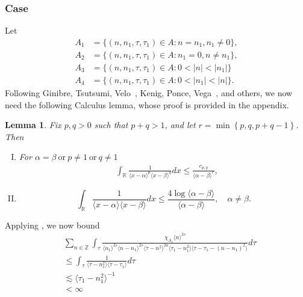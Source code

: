 \documentclass[12pt,reqno]{amsart}
\numberwithin{equation}{section}  %
\renewcommand{\cref}{\Cref}
\newcommand{\rr}{\mathbb{R}}
\newcommand{\zz}{\mathbb{Z}}
\newcommand{\zzdot}{\dot{\zz}}
\newtheorem{lemma}[theorem]{Lemma}
\begin{document}
\subsubsection{Case \cref{it-6}} 
\label{ssec:case-it-6}
Let 
\begin{align*}
A_1&=\{(n, n_1, \tau, \tau_1)\in A: n = n_{1},  n_{1} \neq 0 \},\\
A_2&=\{(n, n_1, \tau, \tau_1)\in A: n_1=0, n \neq n_{1} \},\\
A_3&=\{(n, n_1, \tau, \tau_1)\in A: 0 < | n | <  | n_{1}| \} \\
A_4&=\{(n, n_1, \tau, \tau_1)\in A: 0 < | n_{1} | <  | n| \}.
\end{align*} 
Following Ginibre, Tsutsumi, Velo~\cite{Ginibre:1997jp}, Kenig, Ponce, Vega~\cite{Kenig:1996yn}, and others,
we now need the following Calculus lemma, whose proof is provided in the
appendix.
\begin{lemma}
\label{lem:calc}
Fix $p, q > 0$ such that $p +q >1$, and let $r =\min\left\{p, q, p+q-1
\right\}$. Then 
\begin{enumerate}[(I)]
\item
For $\alpha=\beta \ \text{or} \ p \neq 1 \ \text{or} \ q \neq 1$
\begin{equation*}
\begin{split}
& \int_{\rr} \frac{1}{\langle x - \alpha \rangle ^{p} \langle x -
\beta \rangle
^{q}} d x
\le \frac{c_{p,q}}{\langle \alpha - \beta \rangle ^{r}}, 
\end{split}
\end{equation*}
\item
\begin{equation*}
\int_{\rr} \frac{1}{\langle x - \alpha \rangle  \langle x - \beta
\rangle} d x
\le  \frac{4 \log \langle \alpha - \beta \rangle}{\langle \alpha - \beta
\rangle}, \quad \alpha \neq \beta.
\end{equation*}
\end{enumerate}
\end{lemma}
Applying \cref{lem:calc}, we now bound 
\begin{equation*}
\begin{split}
& 
\sum_{n \in \zzdot} \int_{\tau} \frac{\chi_{A_{1}}\langle n \rangle ^{2s} }{\langle n_{1} \rangle ^{2s} \langle n-n_{1} \rangle ^{2s} \langle \tau - n^{2} \rangle^{2a} 
\langle \tau_{1} - n_{1}^{2} \rangle \langle  \tau - \tau_{1} -
(n - n_{1})^{2} \rangle}
d \tau 
\\
& \le 
\int_{\tau} \frac{1}{\langle \tau -
n_{1}^{2} \rangle \langle
\tau - \tau_{1}\rangle}d \tau
\\
& \lesssim 
\langle \tau_{1} - n_{1}^{2} \rangle ^{-1} 
\\
& < \infty
\end{split}
\end{equation*}
\end{document}

